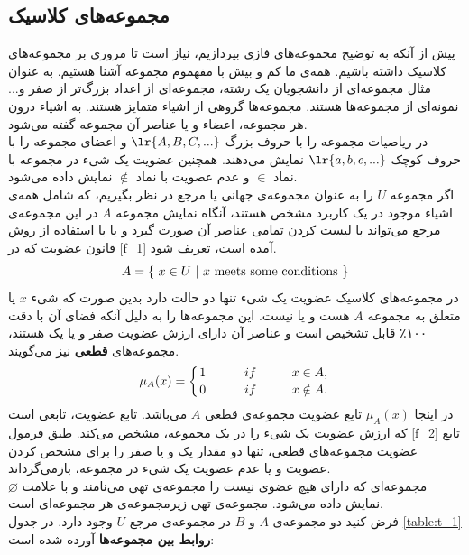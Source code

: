 \documentclass[12pt,a4paper]{article}
\begin{document}
 \subsection{مجموعه‌های کلاسیک}
پیش از آنکه به توضیح مجموعه‌های فازی بپردازیم، نیاز است تا مروری بر مجموعه‌های کلاسیک داشته باشیم. همه‌ی ما کم و بیش با مفهموم مجموعه آشنا هستیم. به عنوان مثال مجموعه‌ای از دانشجویان یک رشته، مجموعه‌ای از اعداد بزرگ‌تر از صفر و... نمونه‌ای از مجموعه‌ها هستند. مجموعه‌ها گروهی از اشیاء متمایز هستند. به اشیاء درون هر مجموعه، اعضاء و یا عناصر آن مجموعه گفته می‌شود. \\
در ریاضیات مجموعه را با حروف بزرگ 
$\lr{A,B,C,...}$
 و اعضای مجموعه را با حروف کوچک 
$\lr{a,b,c,...} $
  نمایش می‌دهند. همچنین عضویت یک شیء در مجموعه با نماد 
$\in$
 و عدم عضویت با نماد
 $\notin$
 نمایش داده می‌شود. 
 \cite{Bojadziev2007}
 \\
 اگر مجموعه $ U $  را به عنوان مجموعه‌ی جهانی یا مرجع در نظر بگیریم، که شامل همه‌ی اشیاء موجود در یک کاربرد مشخص هستند، آنگاه نمایش مجموعه $ A $  در این مجموعه‌ی مرجع می‌تواند با لیست کردن تمامی عناصر آن صورت گیرد و یا با استفاده از روش قانون عضویت که در 
 \ref{f_1}
 آمده است، تعریف شود.
 \cite{Wang1997}
 \begin{equation}\label{f_1}
 A= \{\  x \in U\ |\   x\ {\rm meets\ some\ conditions\ } \}
 \end{equation} 
 در مجموعه‌های کلاسیک عضویت یک شیء تنها دو حالت دارد بدین صورت که شیء $x$ یا متعلق به مجموعه $A$ هست و یا نیست. این مجموعه‌ها را به دلیل آنکه فضای آن با دقت ۱۰۰٪ قابل تشخیص است و عناصر آن دارای ارزش عضویت صفر و یا یک هستند، مجموعه‌های
  \textbf{قطعی}
  نیز می‌گویند. 
\begin{equation}\label{f_2}
\mu_{A}(x)=\left \{ 
	{1 \atop 0}
	\hskip 1cm
   {if \hskip 1cm x \in A, \atop
	if \hskip 1cm x \notin A.} \right.
\end{equation} 
در اینجا
$\mu_{A}(x)$
 تابع عضویت مجموعه‌ی قطعی $A$ می‌باشد. تابع عضویت، تابعی است که ارزش عضویت یک شیء را در یک مجموعه، مشخص می‌کند. طبق فرمول 
 \ref{f_2}
 تابع عضویت مجموعه‌های قطعی، تنها دو مقدار یک و یا صفر را برای مشخص کردن عضویت و یا عدم عضویت یک شیء در  مجموعه، بازمی‌گرداند. \\
 مجموعه‌ای که دارای هیچ عضوی نیست را مجموعه‌ی تهی می‌نامند و با علامت $\varnothing$ نمایش داده می‌شود. مجموعه‌ی تهی زیرمجموعه‌ی هر مجموعه‌ای است.
 \cite{Lee2005}
 \\
فرض کنید دو مجموعه‌ی $ A $ و $ B  $ در مجموعه‌ی مرجع $ U $ وجود دارد.  در جدول   
\ref{table:t_1}
\textbf{روابط بین مجموعه‌ها} 
 آورده شده است:
\end{document}
